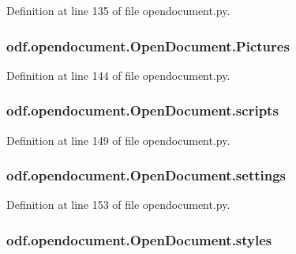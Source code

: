 Definition at line 135 of file opendocument.\+py.

\hypertarget{classodf_1_1opendocument_1_1OpenDocument_a93287d676473594226d2ead2784e431e}{
\subsubsection[{Pictures}]{\setlength{\rightskip}{0pt plus 5cm}odf.\+opendocument.\+Open\+Document.\+Pictures}}\label{classodf_1_1opendocument_1_1OpenDocument_a93287d676473594226d2ead2784e431e}


Definition at line 144 of file opendocument.\+py.

\hypertarget{classodf_1_1opendocument_1_1OpenDocument_a951448b0dd86f2e681de75b53b64af3d}{
\subsubsection[{scripts}]{\setlength{\rightskip}{0pt plus 5cm}odf.\+opendocument.\+Open\+Document.\+scripts}}\label{classodf_1_1opendocument_1_1OpenDocument_a951448b0dd86f2e681de75b53b64af3d}


Definition at line 149 of file opendocument.\+py.

\hypertarget{classodf_1_1opendocument_1_1OpenDocument_a60cfe030a636b00d6ccf16a99159ff31}{
\subsubsection[{settings}]{\setlength{\rightskip}{0pt plus 5cm}odf.\+opendocument.\+Open\+Document.\+settings}}\label{classodf_1_1opendocument_1_1OpenDocument_a60cfe030a636b00d6ccf16a99159ff31}


Definition at line 153 of file opendocument.\+py.

\hypertarget{classodf_1_1opendocument_1_1OpenDocument_a609b7798d88612693837d38dd389ed40}{
\subsubsection[{styles}]{\setlength{\rightskip}{0pt plus 5cm}odf.\+opendocument.\+Open\+Document.\+styles}}\label{classodf_1_1opendocument_1_1OpenDocument_a609b7798d88612693837d38dd389ed40}


